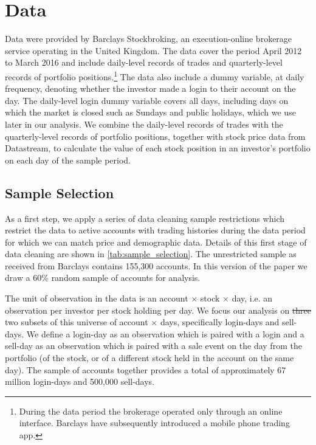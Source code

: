 \section{Data}

Data were provided by Barclays Stockbroking, an execution-online brokerage service operating in the United Kingdom. The data cover the period April 2012 to March 2016 and include daily-level records of trades and quarterly-level records of portfolio positions.\footnote{During the data period the brokerage operated only through an online interface. Barclays have subsequently introduced a mobile phone trading app.} The data also include a dummy variable, at daily frequency, denoting whether the investor made a login to their account on the day. The daily-level login dummy variable covers all days, including days on which the market is closed such as Sundays and public holidays, which we use later in our analysis. We combine the daily-level records of trades with the quarterly-level records of portfolio positions, together with stock price data from Datastream, to calculate the value of each stock position in an investor's portfolio on each day of the sample period.

\subsection{Sample Selection}

As a first step, we apply a series of data cleaning sample restrictions which restrict the data to active accounts with trading histories during the data period for which we can match price and demographic data. Details of this first stage of data cleaning are shown in \ref{tab:sample_selection}. The unrestricted sample as received from Barclays contains 155,300 accounts. In this version of the paper we draw a 60\% random sample of accounts for analysis. 

The unit of observation in the data is an account $\times$ stock $\times$ day, i.e. an observation per investor per stock holding per day. We focus our analysis on \st{three} two subsets of this universe of account $\times$ days, specifically login-days and sell-days. We define a login-day as an observation which is paired with a login and a sell-day as an observation which is paired with a sale event on the day from the portfolio (of the stock, or of a different stock held in the account on the same day). The sample of accounts together provides a total of approximately 67 million login-days and 500,000 sell-days.


